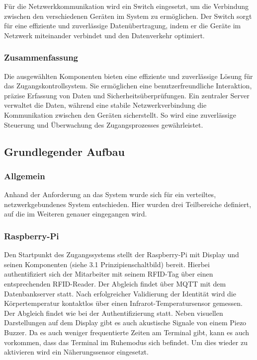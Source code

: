 Für die Netzwerkkommunikation wird ein Switch eingesetzt, um die Verbindung zwischen den verschiedenen Geräten im System zu ermöglichen. Der Switch sorgt für eine effiziente und zuverlässige Datenübertragung, indem er die Geräte im Netzwerk miteinander verbindet und den Datenverkehr optimiert.

\subsubsection{Zusammenfassung}

Die ausgewählten Komponenten bieten eine effiziente und zuverlässige Lösung für das Zugangskontrollsystem. Sie ermöglichen eine benutzerfreundliche Interaktion, präzise Erfassung von Daten und Sicherheitsüberprüfungen. Ein zentraler Server verwaltet die Daten, während eine stabile Netzwerkverbindung die Kommunikation zwischen den Geräten sicherstellt. So wird eine zuverlässige Steuerung und Überwachung des Zugangsprozesses gewährleistet.


\subsection{Grundlegender Aufbau}\label{subsec:grundlegender_aufbau}

\subsubsection{Allgemein}

Anhand der Anforderung an das System wurde sich für ein verteiltes, netzwerkgebundenes System entschieden. Hier wurden drei Teilbereiche definiert, auf die im Weiteren genauer eingegangen wird.

\subsubsection{Raspberry-Pi}

Den Startpunkt des Zugangssystems stellt der Raspberry-Pi mit Display und seinen Komponenten (siehe 3.1 Prinzipienschaltbild) bereit. Hierbei authentifiziert sich der Mitarbeiter mit seinem RFID-Tag über einen entsprechenden RFID-Reader. Der Abgleich findet über MQTT mit dem Datenbankserver statt. Nach erfolgreicher Validierung der Identität wird die Körpertemperatur kontaktlos über einen Infrarot-Temperatursensor gemessen. Der Abgleich findet wie bei der Authentifizierung statt. Neben visuellen Darstellungen auf dem Display gibt es auch akustische Signale von einem Piezo Buzzer. Da es auch weniger frequentierte Zeiten am Terminal gibt, kann es auch vorkommen, dass das Terminal im Ruhemodus sich befindet. Um dies wieder zu aktivieren wird ein Näherungssensor eingesetzt.


